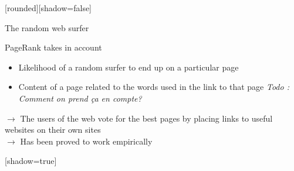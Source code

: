 \documentclass[10pt]{beamer}
\begin{document}
[rounded][shadow=false]
\begin{frame}{The random web surfer}
\begin{block}{PageRank takes in account}
\begin{itemize}
\item Likelihood of a random surfer to end up on a particular page 
\item Content of a page related to the words used in the link to that page \textit{Todo : Comment on prend ça en compte?}
\end{itemize}
$\rightarrow$ The users of the web vote for the best pages by placing links to useful websites on their own sites\\
$\rightarrow$ Has been proved to work empirically
\end{block}
\end{frame}


[shadow=true]
\end{document}
